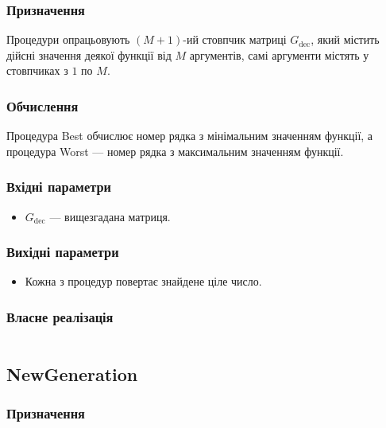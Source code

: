 \documentclass[a4paper, 12pt]{article}
\numberwithin{equation}{section}
\begin{document}
\subsubsection*{Призначення}

Процедури опрацьовують $(M+1)$-ий стовпчик матриці $G_{\text{dec}}$, який містить дійсні значення деякої функції від $M$ аргументів, самі аргументи містять у стовпчиках з $1$ по $M$.

\subsubsection*{Обчислення}

Процедура Best обчислює номер рядка з мінімальним значенням функції, а процедура Worst --- номер рядка з максимальним значенням функції. 

\subsubsection*{Вхідні параметри}

\begin{itemize}
    \item $G_{\text{dec}}$ --- вищезгадана матриця.
\end{itemize}

\subsubsection*{Вихідні параметри}

\begin{itemize}
    \item Кожна з процедур повертає знайдене ціле число.
\end{itemize}

\subsubsection*{Власне реалізація}

\inputminted[firstline=5, lastline=36]{python}{../code/best_worst.py}

\subsection{NewGeneration}

\subsubsection*{Призначення}
\end{document}
